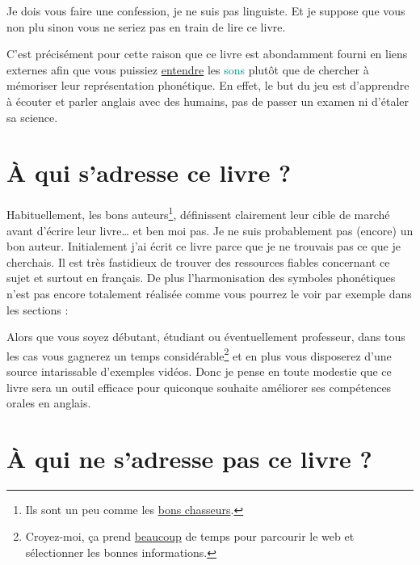 Je dois vous faire une confession, je ne suis pas linguiste. Et je
suppose que vous non plu sinon vous ne seriez pas en train de lire ce
livre.

C'est précisément pour cette raison que ce livre est abondamment
fourni en liens externes afin que vous puissiez \underline{entendre}
les \textcolor{teal}{sons} plutôt que de chercher à mémoriser leur
représentation phonétique. En effet, le but du jeu est d'apprendre à
écouter et parler anglais avec des humains, pas de passer un examen ni
d'étaler sa science.

\newpage

\section{À qui s'adresse ce livre ?}\label{sec:for-who}

Habituellement, les bons auteurs\footnote{Ils sont un peu comme les
  \href{https://www.amazon.fr/gp/product/B0103QW256/ref=as_li_tl?ie=UTF8\&camp=1642\&creative=6746\&creativeASIN=B0103QW256\&linkCode=as2\&tag=wwwbecomefree-21\&linkId=0a96fb10b5f781c84d66ef5b92ea65b6}{bons
    chasseurs}.}, définissent clairement leur cible de marché avant
d'écrire leur livre\dots\xspace et ben moi pas. Je ne suis probablement pas
(encore) un bon auteur. Initialement j'ai écrit ce livre parce que je
ne trouvais pas ce que je cherchais. Il est très fastidieux de trouver
des ressources fiables concernant ce sujet et surtout en français. De
plus l'\hypertarget{notation}{harmonisation} des symboles phonétiques n'est pas encore
totalement réalisée comme vous pourrez le voir par exemple dans les
sections :



  

Alors que vous soyez débutant, étudiant ou éventuellement professeur,
dans tous les cas vous gagnerez un temps
considérable\footnote{Croyez-moi, ça prend \underline{beaucoup} de
temps pour parcourir le web et sélectionner les bonnes informations.}
et en plus vous disposerez d'une source intarissable d'exemples
vidéos. Donc je pense en toute modestie que ce livre sera un outil
efficace pour quiconque souhaite améliorer ses compétences orales en anglais.

\newpage

\section{À qui ne s'adresse pas ce livre ?}\label{sec:for-not-who}

